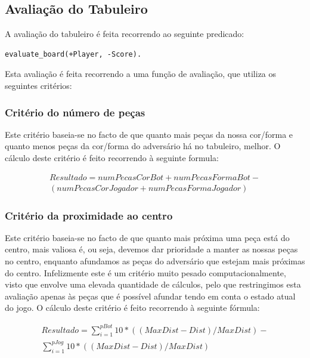 \documentclass[a4paper]{article}
\begin{document}
\subsection{Avaliação do Tabuleiro}
\label{boardeval}

A avaliação do tabuleiro é feita recorrendo ao seguinte predicado:

\begin{lstlisting}
evaluate_board(+Player, -Score).
\end{lstlisting}

Esta avaliação é feita recorrendo a uma função de avaliação, que utiliza os seguintes critérios:

\subsubsection{Critério do número de peças}

Este critério baseia-se no facto de que quanto mais peças da nossa cor/forma e quanto menos peças da cor/forma do adversário há no tabuleiro, melhor. O cálculo deste critério é feito recorrendo à seguinte formula:

\begin{equation*}
\begin{multlined}
Resultado = numPecasCorBot + numPecasFormaBot - \\
(numPecasCorJogador + numPecasFormaJogador)
\end{multlined}
\end{equation*}

\subsubsection{Critério da proximidade ao centro}

Este critério baseia-se no facto de que quanto mais próxima uma peça está do centro, mais valiosa é, ou seja, devemos dar prioridade a manter as nossas peças no centro, enquanto afundamos as peças do adversário que estejam mais próximas do centro. Infelizmente este é um critério muito pesado computacionalmente, visto que envolve uma elevada quantidade de cálculos, pelo que restringimos esta avaliação apenas às peças que é possível afundar tendo em conta o estado atual do jogo. O cálculo deste critério é feito recorrendo à seguinte fórmula:

\begin{equation*}
\begin{multlined}
Resultado = \sum\limits_{i=1}^{pBot} 10 * ((MaxDist - Dist) / MaxDist) - \\\sum\limits_{i=1}^{pJog} 10 * ((MaxDist - Dist) / MaxDist)
\end{multlined}
\end{equation*}
\end{document}
